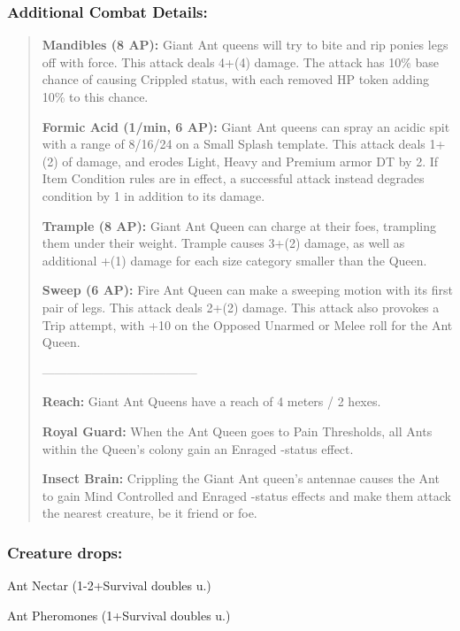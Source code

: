 \documentclass[11pt,a4paper,twocolumn]{book}
\begin{document}
	\subsubsection*{Additional Combat Details:}
	\begin{verse}
		\textbf{Mandibles (8 AP):} Giant Ant queens will try to bite and rip ponies legs off with force. This attack deals 4+(4) damage. The attack has 10\% base chance of causing Crippled status, with each removed HP token adding 10\% to this chance.
		
		\textbf{Formic Acid (1/min, 6 AP):} Giant Ant queens can spray an acidic spit with a range of 8/16/24 on a Small Splash template. This attack deals 1+(2) of damage, and erodes Light, Heavy and Premium armor DT by 2. If Item Condition rules are in effect, a successful attack instead degrades condition by 1 in addition to its damage.
		
		\textbf{Trample (8 AP):} Giant Ant Queen can charge at their foes, trampling them under their weight. Trample causes 3+(2) damage, as well as additional +(1) damage for each size category smaller than the Queen.
		
		\textbf{Sweep (6 AP):} Fire Ant Queen can make a sweeping motion with its first pair of legs. This attack deals 2+(2) damage. This attack also provokes a Trip attempt, with +10 on the Opposed Unarmed or Melee roll for the Ant Queen.
		
		--------------------------------------
		
		\textbf{Reach:} Giant Ant Queens have a reach of 4 meters / 2 hexes.
		
		\textbf{Royal Guard:} When the Ant Queen goes to Pain Thresholds, all Ants within the Queen's colony gain an Enraged -status effect.
		
		\textbf{Insect Brain:} Crippling the Giant Ant queen's antennae causes the Ant to gain Mind Controlled and Enraged -status effects and make them attack the nearest creature, be it friend or foe.
		
	\end{verse}
	
	\subsubsection*{Creature drops:}
	\begin{compactitem}
		\item Ant Nectar (1-2+Survival doubles u.)
		\item Ant Pheromones (1+Survival doubles u.)
	\end{compactitem}
	
\end{document}
